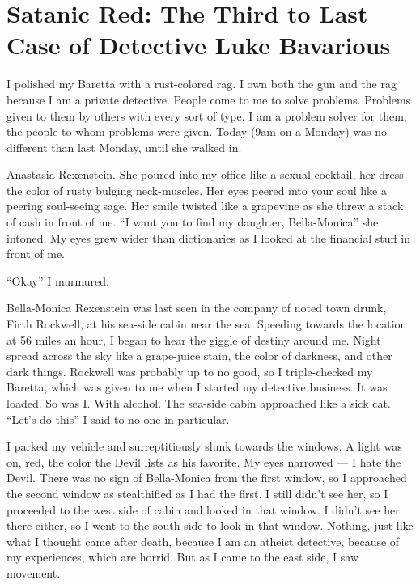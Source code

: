 \chapter[Satanic Red]{Satanic Red: The Third to Last Case of Detective Luke Bavarious}




I polished my Baretta with a rust-colored rag. I own both the gun
and the rag because I am a private detective. People come to me to
solve problems. Problems given to them by others with every sort of
type. I am a problem solver for them, the people to whom problems
were given. Today (9am on a Monday) was no different than last
Monday, until she walked in.



Anastasia Rexenstein. She poured into my office like a sexual
cocktail, her dress the color of rusty bulging neck-muscles. Her
eyes peered into your soul like a peering soul-seeing sage. Her
smile twisted like a grapevine as she threw a stack of cash in
front of me. ``I want you to find my daughter,
Bella-Monica'' she intoned. My eyes grew wider than
dictionaries as I looked at the financial stuff in front of
me.



``Okay'' I murmured.



Bella-Monica Rexenstein was last seen in the company of noted town
drunk, Firth Rockwell, at his sea-side cabin near the sea. Speeding
towards the location at 56 miles an hour, I began to hear the
giggle of destiny around me. Night spread across the sky like a
grape-juice stain, the color of darkness, and other dark things.
Rockwell was probably up to no good, so I triple-checked my
Baretta, which was given to me when I started my detective
business. It was loaded. So was I. With alcohol. The sea-side cabin
approached like a sick cat. ``Let's do this'' I said to
no one in particular.



I parked my vehicle and surreptitiously slunk towards the windows.
A light was on, red, the color the Devil lists as his favorite. My
eyes narrowed --- I hate the Devil. There was no sign of
Bella-Monica from the first window, so I approached the second
window as stealthified as I had the first. I still didn't see her,
so I proceeded to the west side of cabin and looked in that window.
I didn't see her there either, so I went to the south side to look
in that window. Nothing, just like what I thought came after death,
because I am an atheist detective, because of my experiences, which
are horrid. But as I came to the east side, I saw movement.



